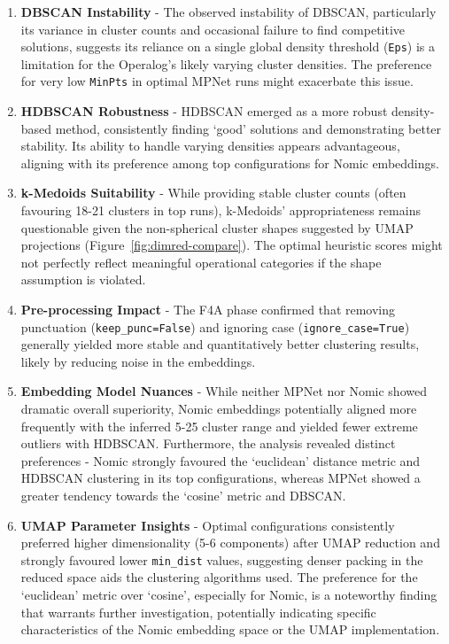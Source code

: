 \documentclass[10pt,oneside]{report}
\begin{document}
\begin{enumerate}
    \item \textbf{DBSCAN Instability} - The observed instability of DBSCAN, particularly its variance in cluster counts and occasional failure to find competitive solutions, suggests its reliance on a single global density threshold (\texttt{Eps}) is a limitation for the Operalog's likely varying cluster densities. The preference for very low \texttt{MinPts} in optimal MPNet runs might exacerbate this issue.

    \item \textbf{HDBSCAN Robustness} - HDBSCAN emerged as a more robust density-based method, consistently finding `good' solutions and demonstrating better stability. Its ability to handle varying densities \cite{campello2013density} appears advantageous, aligning with its preference among top configurations for Nomic embeddings.

    \item \textbf{k-Medoids Suitability} - While providing stable cluster counts (often favouring 18-21 clusters in top runs), k-Medoids' appropriateness remains questionable given the non-spherical cluster shapes suggested by UMAP projections (Figure~\ref{fig:dimred-compare}). The optimal heuristic scores might not perfectly reflect meaningful operational categories if the shape assumption is violated.

    \item \textbf{Pre-processing Impact} - The F4A phase confirmed that removing punctuation (\texttt{keep\_punc=False}) and ignoring case (\texttt{ignore\_case=True}) generally yielded more stable and quantitatively better clustering results, likely by reducing noise in the embeddings.

    \item \textbf{Embedding Model Nuances} - While neither MPNet nor Nomic showed dramatic overall superiority, Nomic embeddings potentially aligned more frequently with the inferred 5-25 cluster range and yielded fewer extreme outliers with HDBSCAN. Furthermore, the analysis revealed distinct preferences - Nomic strongly favoured the `euclidean' distance metric and HDBSCAN clustering in its top configurations, whereas MPNet showed a greater tendency towards the `cosine' metric and DBSCAN.

    \item \textbf{UMAP Parameter Insights} - Optimal configurations consistently preferred higher dimensionality (5-6 components) after UMAP reduction and strongly favoured lower \texttt{min\_dist} values, suggesting denser packing in the reduced space aids the clustering algorithms used. The preference for the `euclidean' metric over `cosine', especially for Nomic, is a noteworthy finding that warrants further investigation, potentially indicating specific characteristics of the Nomic embedding space or the UMAP implementation.


\end{enumerate}
\end{document}
